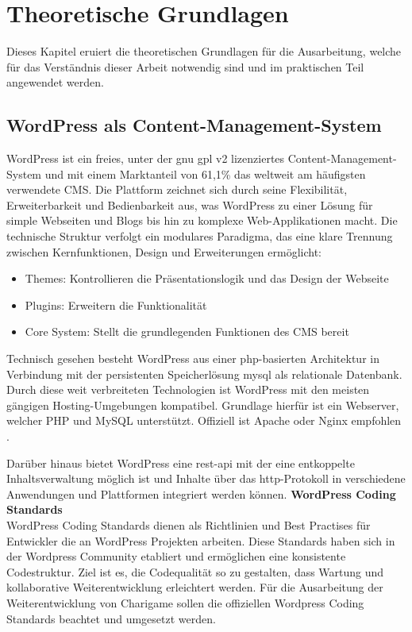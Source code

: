 \chapter{Theoretische Grundlagen}
Dieses Kapitel eruiert die theoretischen Grundlagen für die Ausarbeitung, welche für das Verständnis dieser Arbeit notwendig sind und im praktischen Teil angewendet werden.
\section{WordPress als Content-Management-System}
WordPress ist ein freies, unter der \gls{gnu} \gls{gpl} v2 lizenziertes Content-Management-System und mit einem Marktanteil von 61,1\% das weltweit am häufigsten verwendete CMS. \cite{statista2025cms}
Die Plattform zeichnet sich durch seine Flexibilität, Erweiterbarkeit und Bedienbarkeit aus, was WordPress zu einer Lösung für simple Webseiten und Blogs bis hin zu komplexe Web-Applikationen macht. \cite{patel2019review}
Die technische Struktur verfolgt ein modulares Paradigma, das eine klare Trennung zwischen Kernfunktionen, Design und Erweiterungen ermöglicht:
\begin{itemize}

 \item Themes: Kontrollieren die Präsentationslogik und das Design der Webseite

 \item Plugins: Erweitern die Funktionalität

 \item Core System: Stellt die grundlegenden Funktionen des CMS bereit

\end{itemize}
Technisch gesehen besteht WordPress aus einer \gls{php}-basierten Architektur in Verbindung mit der persistenten Speicherlösung \gls{mysql} als relationale Datenbank.
Durch diese weit verbreiteten Technologien ist WordPress mit den meisten gängigen Hosting-Umgebungen kompatibel.
Grundlage hierfür ist ein Webserver, welcher PHP und MySQL unterstützt.
Offiziell ist Apache oder Nginx empfohlen \cite{wordpress2024requirements}.

Darüber hinaus bietet WordPress eine \gls{rest}-\gls{api} mit der eine entkoppelte Inhaltsverwaltung möglich ist und Inhalte über das \gls{http}-Protokoll in verschiedene Anwendungen und Plattformen integriert werden können.
\newpage
\textbf{WordPress Coding Standards}\\
WordPress Coding Standards dienen als Richtlinien und Best Practises für Entwickler die an WordPress Projekten arbeiten.
Diese Standards haben sich in der Wordpress Community etabliert und ermöglichen eine konsistente Codestruktur.
Ziel ist es, die Codequalität so zu gestalten, dass Wartung und kollaborative Weiterentwicklung erleichtert werden.
Für die Ausarbeitung der Weiterentwicklung von Charigame sollen die offiziellen Wordpress Coding Standards beachtet und umgesetzt werden.


